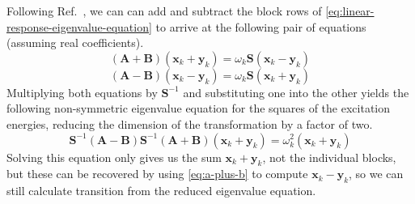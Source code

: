 Following Ref.~, we can can add and subtract the
block rows of \cref{eq:linear-response-eigenvalue-equation} to arrive at the
following pair of equations (assuming real coefficients).
\begin{equation}
    \label{eq:a-plus-b}
    (\mathbf{A} + \mathbf{B})
    (\mathbf{x}_k + \mathbf{y}_k)
    =
    \omega_k
    \mathbf{S}
    (\mathbf{x}_k - \mathbf{y}_k)
\end{equation}
\begin{equation}
    \label{eq:a-minus-b}
    (\mathbf{A} - \mathbf{B})
    (\mathbf{x}_k - \mathbf{y}_k)
    =
    \omega_k
    \mathbf{S}
    (\mathbf{x}_k + \mathbf{y}_k)
\end{equation}
Multiplying both equations by
\(
    \mathbf{S}^{-1}
\)
and substituting one into the other yields the following non-symmetric
eigenvalue equation for the squares of the excitation energies, reducing the
dimension of the transformation by a factor of two.
\begin{equation}
    \label{eq:davidson:reduced-eigenvalue-equation}
    \mathbf{S}^{-1}
    (
        \mathbf{A} - \mathbf{B}
    )
    \mathbf{S}^{-1}
    (
        \mathbf{A} + \mathbf{B}
    )
    (\mathbf{x}_k + \mathbf{y}_k)
    =
    \omega_k^2
    (\mathbf{x}_k + \mathbf{y}_k)
\end{equation}
Solving this equation only gives us the sum \(\mathbf{x}_k + \mathbf{y}_k\), not
the individual blocks, but these can be recovered by using \cref{eq:a-plus-b} to
compute \(\mathbf{x}_k - \mathbf{y}_k\), so we can still calculate transition
from the reduced eigenvalue equation.

